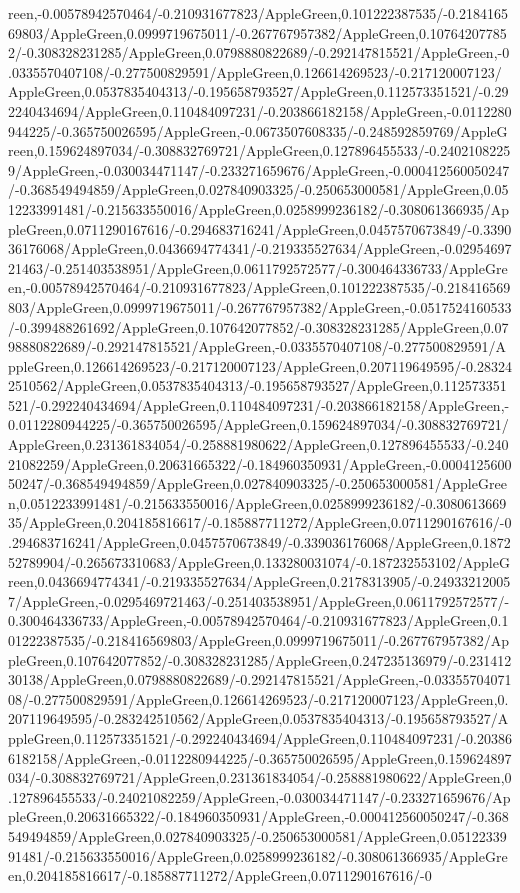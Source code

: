 {\begin{tikzternal}
{reen,-0.00578942570464/-0.210931677823/AppleGreen,0.101222387535/-0.218416569803/AppleGreen,0.0999719675011/-0.267767957382/AppleGreen,0.107642077852/-0.308328231285/AppleGreen,0.0798880822689/-0.292147815521/AppleGreen,-0.0335570407108/-0.277500829591/AppleGreen,0.126614269523/-0.217120007123/AppleGreen,0.0537835404313/-0.195658793527/AppleGreen,0.112573351521/-0.292240434694/AppleGreen,0.110484097231/-0.203866182158/AppleGreen,-0.0112280944225/-0.365750026595/AppleGreen,-0.0673507608335/-0.248592859769/AppleGreen,0.159624897034/-0.308832769721/AppleGreen,0.127896455533/-0.24021082259/AppleGreen,-0.030034471147/-0.233271659676/AppleGreen,-0.000412560050247/-0.368549494859/AppleGreen,0.027840903325/-0.250653000581/AppleGreen,0.0512233991481/-0.215633550016/AppleGreen,0.0258999236182/-0.308061366935/AppleGreen,0.0711290167616/-0.294683716241/AppleGreen,0.0457570673849/-0.339036176068/AppleGreen,0.0436694774341/-0.219335527634/AppleGreen,-0.0295469721463/-0.251403538951/AppleGreen,0.0611792572577/-0.300464336733/AppleGreen,-0.00578942570464/-0.210931677823/AppleGreen,0.101222387535/-0.218416569803/AppleGreen,0.0999719675011/-0.267767957382/AppleGreen,-0.0517524160533/-0.399488261692/AppleGreen,0.107642077852/-0.308328231285/AppleGreen,0.0798880822689/-0.292147815521/AppleGreen,-0.0335570407108/-0.277500829591/AppleGreen,0.126614269523/-0.217120007123/AppleGreen,0.207119649595/-0.283242510562/AppleGreen,0.0537835404313/-0.195658793527/AppleGreen,0.112573351521/-0.292240434694/AppleGreen,0.110484097231/-0.203866182158/AppleGreen,-0.0112280944225/-0.365750026595/AppleGreen,0.159624897034/-0.308832769721/AppleGreen,0.231361834054/-0.258881980622/AppleGreen,0.127896455533/-0.24021082259/AppleGreen,0.20631665322/-0.184960350931/AppleGreen,-0.000412560050247/-0.368549494859/AppleGreen,0.027840903325/-0.250653000581/AppleGreen,0.0512233991481/-0.215633550016/AppleGreen,0.0258999236182/-0.308061366935/AppleGreen,0.204185816617/-0.185887711272/AppleGreen,0.0711290167616/-0.294683716241/AppleGreen,0.0457570673849/-0.339036176068/AppleGreen,0.187252789904/-0.265673310683/AppleGreen,0.133280031074/-0.187232553102/AppleGreen,0.0436694774341/-0.219335527634/AppleGreen,0.2178313905/-0.249332120057/AppleGreen,-0.0295469721463/-0.251403538951/AppleGreen,0.0611792572577/-0.300464336733/AppleGreen,-0.00578942570464/-0.210931677823/AppleGreen,0.101222387535/-0.218416569803/AppleGreen,0.0999719675011/-0.267767957382/AppleGreen,0.107642077852/-0.308328231285/AppleGreen,0.247235136979/-0.23141230138/AppleGreen,0.0798880822689/-0.292147815521/AppleGreen,-0.0335570407108/-0.277500829591/AppleGreen,0.126614269523/-0.217120007123/AppleGreen,0.207119649595/-0.283242510562/AppleGreen,0.0537835404313/-0.195658793527/AppleGreen,0.112573351521/-0.292240434694/AppleGreen,0.110484097231/-0.203866182158/AppleGreen,-0.0112280944225/-0.365750026595/AppleGreen,0.159624897034/-0.308832769721/AppleGreen,0.231361834054/-0.258881980622/AppleGreen,0.127896455533/-0.24021082259/AppleGreen,-0.030034471147/-0.233271659676/AppleGreen,0.20631665322/-0.184960350931/AppleGreen,-0.000412560050247/-0.368549494859/AppleGreen,0.027840903325/-0.250653000581/AppleGreen,0.0512233991481/-0.215633550016/AppleGreen,0.0258999236182/-0.308061366935/AppleGreen,0.204185816617/-0.185887711272/AppleGreen,0.0711290167616/-0}
\end{tikzternal}}
